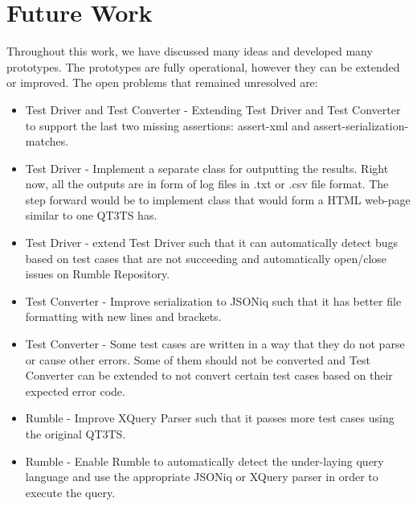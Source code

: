 \section{Future Work}
Throughout this work, we have discussed many ideas and developed many prototypes. The prototypes are fully operational, however they can be extended or improved. The open problems that remained unresolved are:
\begin{itemize}
	\item Test Driver and Test Converter - Extending Test Driver and Test Converter to support the last two missing assertions: assert-xml and assert-serialization-matches.
	\item Test Driver - Implement a separate class for outputting the results. Right now, all the outputs are in form of log files in .txt or .csv file format. The step forward would be to implement class that would form a HTML web-page similar to one QT3TS has.
	\item Test Driver - extend Test Driver such that it can automatically detect bugs based on test cases that are not succeeding and automatically open/close issues on Rumble Repository.
	\item Test Converter - Improve serialization to JSONiq such that it has better file formatting with new lines and brackets.
	\item Test Converter - Some test cases are written in a way that they do not parse or cause other errors. Some of them should not be converted and Test Converter can be extended to not convert certain test cases based on their expected error code.
	\item Rumble - Improve XQuery Parser such that it passes more test cases using the original QT3TS.
	\item Rumble - Enable Rumble to automatically detect the under-laying query language and use the appropriate JSONiq or XQuery parser in order to execute the query. 
\end{itemize}